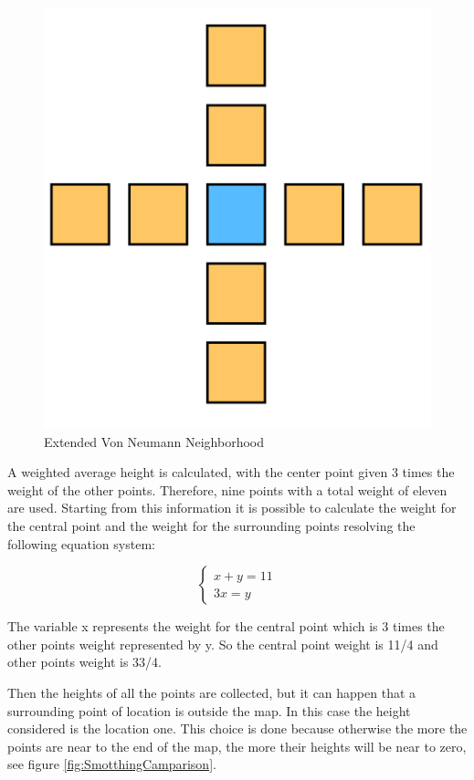 \documentclass[12pt]{article}
\begin{document}
    \begin{figure}
        \centering
        \includegraphics[scale = 0.7]{images/Extended VonNeumannNeighborhood.png}
        \caption{Extended Von Neumann Neighborhood}
        \label{fig:vonNeumann}
    \end{figure}

    \noindent
    A weighted average height is calculated, with the center point given 3 times the weight of the other points. Therefore, nine points with a total weight of eleven are used.
    Starting from this information it is possible to calculate the weight for the central point and the weight for the surrounding points resolving the following equation system:

    \begin{equation}
        \begin{cases}
            x + y = 11
            \\ 3x = y
        \end{cases}
    \end{equation}

    \noindent
    The variable x represents the weight for the central point which is 3 times the other points weight represented by y. So the central point weight is 11/4 and other points weight is 33/4.

    Then the heights of all the points are collected, but it can happen that a surrounding point of location is outside the map. In this case the height considered  is the location one. 
    This choice is done because otherwise the more the points are near to the end of the map, the more their heights will be near to zero, see figure \ref{fig:SmotthingCamparison}.
    
\end{document}
